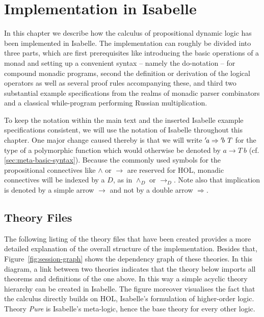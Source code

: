 
\chapter{Implementation in Isabelle}
\label{cha:implementation}

In this chapter we describe how the calculus of propositional dynamic logic has
been implemented in Isabelle. The implementation can roughly be divided into
three parts, which are first prerequisites like introducing the basic operations
of a monad and setting up a convenient syntax -- namely the do-notation -- for
compound monadic programs, second the definition or derivation of the logical
operators as well as several proof rules accompanying these, and third two
substantial example specifications from the realms of monadic parser combinators and
a classical while-program performing Russian multiplication.

To keep the notation within the main text and the inserted Isabelle example
specifications consistent, we will use the notation of Isabelle throughout this
chapter. One major change caused thereby is that we will write ${'\!\mathit{a}} \Rightarrow
{'\!\mathit{b}}\ T$ for the type of a polymorphic function which would otherwise be
denoted by $a \to T\ b$ (cf. \ref{sec:meta-basic-syntax}). Because the commonly
used symbols for the propositional connectives like $\land$ or $\longrightarrow$ are 
reserved for HOL, monadic connectives will be indexed by a $D$, as in $\land_D$
or $\longrightarrow_D$. Note also that implication is denoted by a simple arrow $\longrightarrow$ and not by
a double arrow $\Rightarrow$.

\section{Theory Files}

The following listing of the theory files that have been created provides a more
detailed explanation of the overall structure of the implementation. Besides
that, Figure~\ref{fig:session-graph} shows the dependency graph of these
theories. In this diagram, a link between two theories indicates that the theory
below imports all theorems and definitions of the one above. In this way a simple
acyclic theory hierarchy can be created in Isabelle. The figure moreover
visualises the fact that the calculus directly builds on HOL, Isabelle's
formulation of higher-order logic. Theory \textit{Pure} is Isabelle's
meta-logic, hence the base theory for every other logic.

